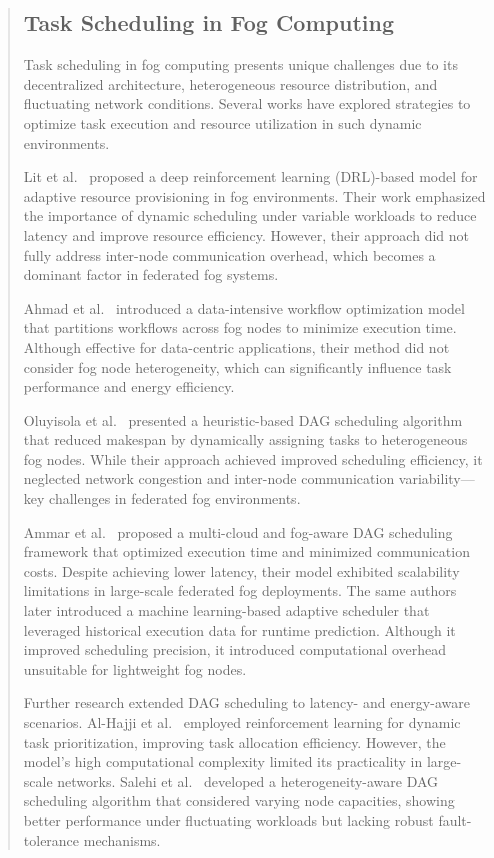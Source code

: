 \documentclass[conference]{IEEEtran}
\begin{document}
\begin{abstract}
\subsection{Task Scheduling in Fog Computing}

Task scheduling in fog computing presents unique challenges due to its decentralized architecture, heterogeneous resource distribution, and fluctuating network conditions. Several works have explored strategies to optimize task execution and resource utilization in such dynamic environments.

Lit et al.~\cite{provisioning2023} proposed a deep reinforcement learning (DRL)-based model for adaptive resource provisioning in fog environments. Their work emphasized the importance of dynamic scheduling under variable workloads to reduce latency and improve resource efficiency. However, their approach did not fully address inter-node communication overhead, which becomes a dominant factor in federated fog systems.

Ahmad et al.~\cite{ahmad2014workflow} introduced a data-intensive workflow optimization model that partitions workflows across fog nodes to minimize execution time. Although effective for data-centric applications, their method did not consider fog node heterogeneity, which can significantly influence task performance and energy efficiency.

Oluyisola et al.~\cite{oluyisola2022dag} presented a heuristic-based DAG scheduling algorithm that reduced makespan by dynamically assigning tasks to heterogeneous fog nodes. While their approach achieved improved scheduling efficiency, it neglected network congestion and inter-node communication variability—key challenges in federated fog environments.

Ammar et al.~\cite{ammar2022multicloud} proposed a multi-cloud and fog-aware DAG scheduling framework that optimized execution time and minimized communication costs. Despite achieving lower latency, their model exhibited scalability limitations in large-scale federated fog deployments. The same authors later introduced a machine learning-based adaptive scheduler that leveraged historical execution data for runtime prediction. Although it improved scheduling precision, it introduced computational overhead unsuitable for lightweight fog nodes.

Further research extended DAG scheduling to latency- and energy-aware scenarios. Al-Hajji et al.~\cite{alhajji2022reinforcement} employed reinforcement learning for dynamic task prioritization, improving task allocation efficiency. However, the model’s high computational complexity limited its practicality in large-scale networks. Salehi et al.~\cite{Salehi2016} developed a heterogeneity-aware DAG scheduling algorithm that considered varying node capacities, showing better performance under fluctuating workloads but lacking robust fault-tolerance mechanisms.


\end{abstract}
\end{document}
